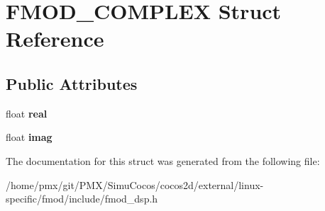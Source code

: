 \hypertarget{structFMOD__COMPLEX}{}\section{F\+M\+O\+D\+\_\+\+C\+O\+M\+P\+L\+EX Struct Reference}
\label{structFMOD__COMPLEX}
\subsection*{Public Attributes}
\begin{DoxyCompactItemize}
\item 
\mbox{\label{structFMOD__COMPLEX_ab57c2a7e564944d3ed15c9fcd6021319}} 
float {\bfseries real}
\item 
\mbox{\label{structFMOD__COMPLEX_a674759f9c9eedd714ff22ee305cf46a0}} 
float {\bfseries imag}
\end{DoxyCompactItemize}


The documentation for this struct was generated from the following file\+:\begin{DoxyCompactItemize}
\item 
/home/pmx/git/\+P\+M\+X/\+Simu\+Cocos/cocos2d/external/linux-\/specific/fmod/include/fmod\+\_\+dsp.\+h\end{DoxyCompactItemize}
